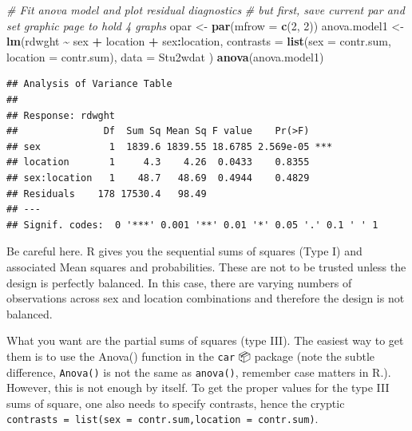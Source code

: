\documentclass[
  12pt,
]{book}
\makeatletter
\newenvironment{Shaded}{\begin{snugshade}}{\end{snugshade}}
\newcommand{\CommentTok}[1]{\textcolor[rgb]{0.56,0.35,0.01}{\textit{#1}}}
\newcommand{\DataTypeTok}[1]{\textcolor[rgb]{0.13,0.29,0.53}{#1}}
\newcommand{\DecValTok}[1]{\textcolor[rgb]{0.00,0.00,0.81}{#1}}
\newcommand{\KeywordTok}[1]{\textcolor[rgb]{0.13,0.29,0.53}{\textbf{#1}}}
\newcommand{\NormalTok}[1]{#1}
\newcommand{\OperatorTok}[1]{\textcolor[rgb]{0.81,0.36,0.00}{\textbf{#1}}}
\newcommand{\StringTok}[1]{\textcolor[rgb]{0.31,0.60,0.02}{#1}}
\newenvironment{kframe}{%
\medskip{}
\setlength{\fboxsep}{.8em}
\def\at@end@of@kframe{}%
\ifinner\ifhmode%
 \def\at@end@of@kframe{\end{minipage}}%
 \begin{minipage}{\columnwidth}%
\fi\fi%
\def\FrameCommand##1{\hskip\@totalleftmargin \hskip-\fboxsep
\colorbox{incolor}{##1}\hskip-\fboxsep
    \hskip-\linewidth \hskip-\@totalleftmargin \hskip\columnwidth}%
\MakeFramed {\advance\hsize-\width
  \@totalleftmargin\z@ \linewidth\hsize
  \@setminipage}}%
{\par\unskip\endMakeFramed%
\at@end@of@kframe}
\newenvironment{rmdblock}[1]
 {
 \begin{itemize}
 \renewcommand{\labelitemi}{
   \raisebox{-.7\height}[0pt][0pt]{
     {\setkeys{Gin}{width=3em,keepaspectratio}\texttt{[image: images/\#1]}}
   }
 }
 \begin{kframe}
 \setlength{\fboxsep}{1em}
 \item
 }
 {
 \end{kframe}
 \end{itemize}
 }
\newenvironment{rmdwarning}
  {\begin{rmdblock}{warning}}
  {\end{rmdblock}}
\makeatother
\begin{document}
\begin{Shaded}
\begin{Highlighting}[]
\CommentTok{\# Fit anova model and plot residual diagnostics}
\CommentTok{\# but first, save current par and set graphic page to hold 4 graphs}
\NormalTok{opar \textless{}{-}}\StringTok{ }\KeywordTok{par}\NormalTok{(}\DataTypeTok{mfrow =} \KeywordTok{c}\NormalTok{(}\DecValTok{2}\NormalTok{, }\DecValTok{2}\NormalTok{))}
\NormalTok{anova.model1 \textless{}{-}}\StringTok{ }\KeywordTok{lm}\NormalTok{(rdwght }\OperatorTok{\textasciitilde{}}\StringTok{ }\NormalTok{sex }\OperatorTok{+}\StringTok{ }\NormalTok{location }\OperatorTok{+}\StringTok{ }\NormalTok{sex}\OperatorTok{:}\NormalTok{location,}
  \DataTypeTok{contrasts =} \KeywordTok{list}\NormalTok{(}\DataTypeTok{sex =}\NormalTok{ contr.sum, }\DataTypeTok{location =}\NormalTok{ contr.sum),}
  \DataTypeTok{data =}\NormalTok{ Stu2wdat}
\NormalTok{)}
\KeywordTok{anova}\NormalTok{(anova.model1)}
\end{Highlighting}
\end{Shaded}

\begin{verbatim}
## Analysis of Variance Table
## 
## Response: rdwght
##               Df  Sum Sq Mean Sq F value    Pr(>F)    
## sex            1  1839.6 1839.55 18.6785 2.569e-05 ***
## location       1     4.3    4.26  0.0433    0.8355    
## sex:location   1    48.7   48.69  0.4944    0.4829    
## Residuals    178 17530.4   98.49                      
## ---
## Signif. codes:  0 '***' 0.001 '**' 0.01 '*' 0.05 '.' 0.1 ' ' 1
\end{verbatim}

\begin{rmdwarning}
Be careful here. R gives you the sequential sums of squares (Type I) and associated Mean squares and probabilities. These are not to be trusted unless the design is perfectly balanced. In this case, there are varying numbers of observations across sex and location combinations and therefore the design is not balanced.
\end{rmdwarning}

What you want are the partial sums of squares (type III). The easiest way to get them is to use the Anova() function in the \texttt{car} 📦 package (note the subtle difference, \texttt{Anova()} is not the same as \texttt{anova()}, remember case matters in R.). However, this is not enough by itself. To get the proper values for the type III sums of square, one also needs to specify contrasts, hence the cryptic \texttt{contrasts\ =\ list(sex\ =\ contr.sum,location\ =\ contr.sum)}.
\end{document}
